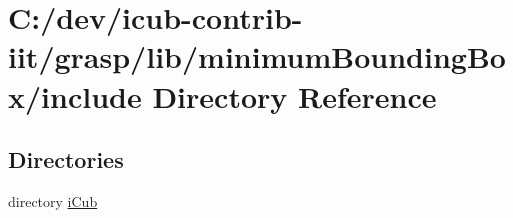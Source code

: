 \section{C\+:/dev/icub-\/contrib-\/iit/grasp/lib/minimum\+Bounding\+Box/include Directory Reference}
\label{dir_40c82b377ee2f2260824bc8bd89d90af}
\subsection*{Directories}
\begin{DoxyCompactItemize}
\item 
directory \hyperlink{dir_c0f5c009eb99e38f1612d11fd15255eb}{i\+Cub}
\end{DoxyCompactItemize}
